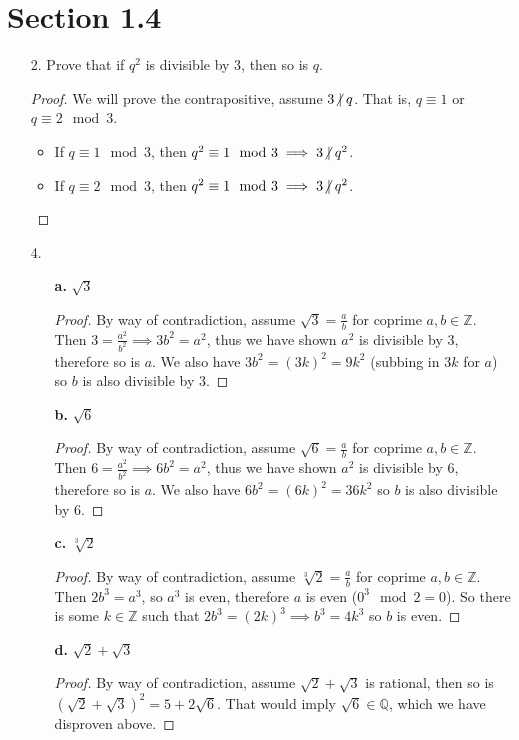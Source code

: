 \documentclass[hidelinks,12pt]{article}
\let\marvosymLightning\Lightning
\newcommand{\Z}{\mathbb{Z}}
\newcommand{\Q}{\mathbb{Q}}
\begin{document}
\section*{Section 1.4}
\begin{itemize}
    \item[2.] Prove that if $q^2$ is divisible by 3, then so is $q$.\begin{proof}
        We will prove the contrapositive, assume $3\centernot|q$. That is, $q\equiv1$ or $q\equiv2 \mod{3}$.\begin{itemize}
            \item If $q\equiv1\mod{3}$, then $q^2\equiv1\mod{3}\implies3\centernot|q^2$.
            \item If $q\equiv2\mod{3}$, then $q^2\equiv1\mod{3}\implies3\centernot|q^2$.
        \end{itemize}
    \end{proof}
    \item[4.]\begin{enumerate}
        \item[\bf{a.}] $\sqrt{3}$\begin{proof}
            By way of contradiction, assume $\sqrt{3}=\frac{a}{b}$ for coprime $a,b\in\Z$. Then $3=\frac{a^2}{b^2}\implies 3b^2=a^2$, thus we have shown $a^2$ is divisible by 3, therefore so is $a$. We also have $3b^2=(3k)^2=9k^2$ (subbing in $3k$ for $a$) so $b$ is also divisible by $3$. \marvosymLightning
        \end{proof}
        \item[\bf{b.}] $\sqrt{6}$\begin{proof}
        By way of contradiction, assume $\sqrt{6}=\frac{a}{b}$ for coprime $a,b\in\Z$. Then $6=\frac{a^2}{b^2}\implies 6b^2=a^2$, thus we have shown $a^2$ is divisible by 6, therefore so is $a$. We also have $6b^2=(6k)^2=36k^2$ so $b$ is also divisible by 6. \marvosymLightning\end{proof}
        \item[\bf{c.}] $\sqrt[3]{2}$\begin{proof}
            By way of contradiction, assume $\sqrt[3]{2}=\frac{a}{b}$ for coprime $a,b\in\Z$. Then $2b^3=a^3$, so $a^3$ is even, therefore $a$ is even ($0^3\mod2=0$). So there is some $k\in\Z$ such that $2b^3=(2k)^3\implies b^3=4k^3$ so $b$ is even. \marvosymLightning
        \end{proof}
        \item[\bf{d.}] $\sqrt{2}+\sqrt{3}$\begin{proof}
            By way of contradiction, assume $\sqrt{2}+\sqrt{3}$ is rational, then so is $(\sqrt{2}+\sqrt{3})^2=5+2\sqrt{6}$. That would imply $\sqrt{6}\in\Q$, which we have disproven above.

\end{proof}
\end{enumerate}
\end{itemize}
\end{document}
